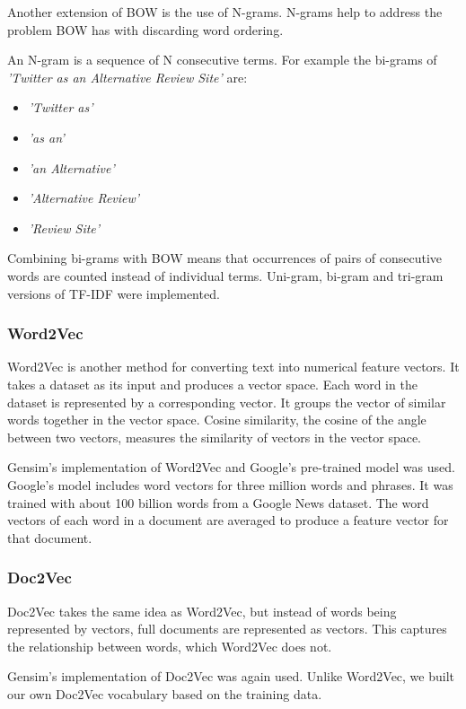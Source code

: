 Another extension of BOW is the use of N-grams. N-grams help to address the problem BOW has with discarding word ordering.

An N-gram is a sequence of N consecutive terms. For example the bi-grams of \emph{'Twitter as an Alternative Review Site'} are:
\begin{itemize}
    \item \emph{'Twitter as'}
    \item \emph{'as an'}
    \item \emph{'an Alternative'}
    \item \emph{'Alternative Review'}
    \item \emph{'Review Site'}
\end{itemize}

Combining bi-grams with BOW means that occurrences of pairs of consecutive words are counted instead of individual terms. Uni-gram, bi-gram and tri-gram versions of TF-IDF were implemented.

\subsubsection{Word2Vec}

Word2Vec is another method for converting text into numerical feature vectors. It takes a dataset as its input and produces a vector space. Each word in the dataset is represented by a corresponding vector. It groups the vector of similar words together in the vector space. Cosine similarity, the cosine of the angle between two vectors, measures the similarity of vectors in the vector space. 

Gensim's implementation of Word2Vec \cite{gensim} and Google's pre-trained model was used. Google's model includes word vectors for three million words and phrases. It was trained with about 100 billion words from a Google News dataset. The word vectors of each word in a document are averaged to produce a feature vector for that document.

\subsubsection*{Doc2Vec}

Doc2Vec takes the same idea as Word2Vec, but instead of words being represented by vectors, full documents are represented as vectors. This captures the relationship between words, which Word2Vec does not.

Gensim's implementation of Doc2Vec was again used. Unlike Word2Vec, we built our own Doc2Vec vocabulary based on the training data.

